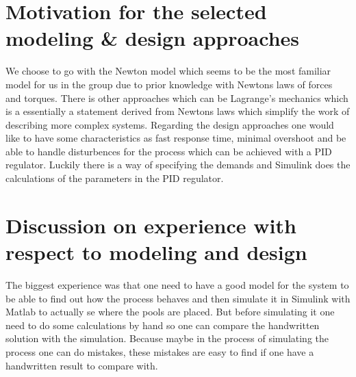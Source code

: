 \documentclass{article}
\begin{document}
\section{Motivation for the selected modeling \& design approaches}

We choose to go with the Newton model which seems to be the most familiar model for us in the group due to prior knowledge with Newtons laws of forces and torques. There is other approaches which can be Lagrange's mechanics which is a essentially a statement derived from Newtons laws which simplify the work of describing more complex systems. Regarding the design approaches one would like to have some characteristics as fast response time, minimal overshoot and be able to handle disturbences for the process which can be achieved with a PID regulator. Luckily there is a way of specifying the demands and Simulink does the calculations of the parameters in the PID regulator. 


\section{Discussion on experience with respect to modeling and design}

The biggest experience was that one need to have a good model for the system to be able to find out how the process behaves and then simulate it in Simulink with Matlab to actually se where the pools are placed. But before simulating it one need to do some calculations by hand so one can compare the handwritten solution with the simulation. Because maybe in the process of simulating the process one can do mistakes, these mistakes are easy to find if one have a handwritten result to compare with.  
\end{document}
